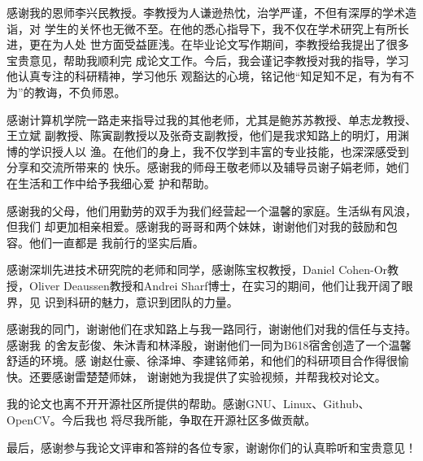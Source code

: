 \begin{ack}

  感谢我的恩师李兴民教授。李教授为人谦逊热忱，治学严谨，不但有深厚的学术造诣，对
  学生的关怀也无微不至。在他的悉心指导下，我不仅在学术研究上有所长进，更在为人处
  世方面受益匪浅。在毕业论文写作期间，李教授给我提出了很多宝贵意见，帮助我顺利完
  成论文工作。今后，我会谨记李教授对我的指导，学习他认真专注的科研精神，学习他乐
  观豁达的心境，铭记他“知足知不足，有为有不为”的教诲，不负师恩。

  感谢计算机学院一路走来指导过我的其他老师，尤其是鲍苏苏教授、单志龙教授、王立斌
  副教授、陈寅副教授以及张奇支副教授，他们是我求知路上的明灯，用渊博的学识授人以
  渔。在他们的身上，我不仅学到丰富的专业技能，也深深感受到分享和交流所带来的
  快乐。感谢我的师母王敬老师以及辅导员谢子娟老师，她们在生活和工作中给予我细心爱
  护和帮助。

  感谢我的父母，他们用勤劳的双手为我们经营起一个温馨的家庭。生活纵有风浪，但我们
  却更加相亲相爱。感谢我的哥哥和两个妹妹，谢谢他们对我的鼓励和包容。他们一直都是
  我前行的坚实后盾。
  
  感谢深圳先进技术研究院的老师和同学，感谢陈宝权教授，Daniel Cohen-Or教
  授，Oliver Deaussen教授和Andrei Sharf博士，在实习的期间，他们让我开阔了眼界，见
  识到科研的魅力，意识到团队的力量。

  感谢我的同门，谢谢他们在求知路上与我一路同行，谢谢他们对我的信任与支持。感谢我
  的舍友彭俊、朱沐青和林泽殷，谢谢他们一同为B618宿舍创造了一个温馨舒适的环境。感
  谢赵仕豪、徐泽坤、李建铭师弟，和他们的科研项目合作得很愉快。还要感谢雷楚楚师妹，
  谢谢她为我提供了实验视频，并帮我校对论文。

  我的论文也离不开开源社区所提供的帮助。感谢GNU、Linux、Github、OpenCV。今后我也
  将尽我所能，争取在开源社区多做贡献。

  最后，感谢参与我论文评审和答辩的各位专家，谢谢你们的认真聆听和宝贵意见！
  
\end{ack}

